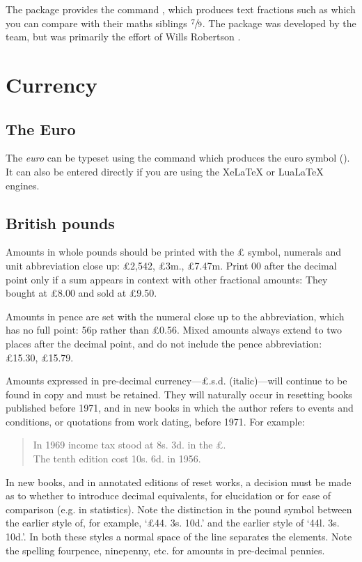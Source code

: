 The package provides the command \cmd{\sfrac}, which produces text fractions such as  which you can compare with their maths siblings $\sfrac{7}{9}$. The package was developed by the \latex team, but was primarily the effort of Wills Robertson \citep{xfrac}. 

\section{Currency}

\subsection{The Euro}
The \textit{euro} can be typeset using the command \cmd{\texteuro} which produces the euro symbol (\texteuro). It can also be entered directly if you are using the XeLaTeX or LuaLaTeX engines. 

\subsection{British pounds}
Amounts in whole pounds should be printed with the £ symbol, numerals
and unit abbreviation close up: £2,542, £3m., £7.47m. Print 00
after the decimal point only if a sum appears in context with other
fractional amounts: They bought at £8.00 and sold at £9.50.

Amounts in pence are set with the numeral close up to the abbreviation,
which has no full point: 56p rather than £0.56. Mixed amounts
always extend to two places after the decimal point, and do not include
the pence abbreviation: £15.30, £15.79.

Amounts expressed in pre-decimal currency---£.s.d. (italic)---will
continue to be found in copy and must be retained. They will naturally occur in resetting books published before 1971, and in new books in
which the author refers to events and conditions, or quotations from
work dating, before 1971. For example:

\begin{quote}
In 1969 income tax stood at 8s. 3d. in the £.\\
The tenth edition cost 10s. 6d. in 1956.
\end{quote}

In new books, and in annotated editions of reset works, a decision must
be made as to whether to introduce decimal equivalents, for elucidation
or for ease of comparison (e.g. in statistics). Note the distinction in the
pound symbol between the earlier style of, for example, `£44. 3s. 10d.'
and the earlier style of `44l. 3s. 10d.'. In both these styles a normal space
of the line separates the elements. Note the spelling fourpence, ninepenny, etc. for amounts in pre-decimal pennies.  

